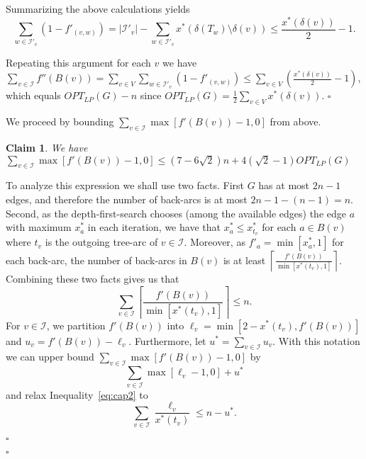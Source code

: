 \documentclass[letterpaper,11pt]{article}
\newtheorem{claim}[theorem]{Claim}
\newenvironment{proofclaim}{\begin{trivlist}
\item[\hskip\labelsep {\it Proof of Claim}.]}{\QED \end{trivlist}}
\newenvironment{proof}{\begin{trivlist}
\item[\hskip\labelsep {\bf Proof}.]}{\QED \end{trivlist}}
\newcommand{\QED}{\hfill $\square$}
\newcommand{\OLP}[1]{\ensuremath{OPT_{LP}(#1)}}
\begin{document}
\begin{proof}
\begin{proofclaim}
\noindent Summarizing the above calculations yields
$$
\sum_{w\in \mathcal{I}'_v} \left(1- f'_{(v,w)}\right) = |\mathcal{I}'_v| -
\sum_{w\in \mathcal{I}'_v} x^*(\delta(T_w) \setminus \delta(v)) \leq \frac{x^*(\delta(v))}{2} - 1.
$$

Repeating this argument for each $v$ we have $\sum_{v\in \mathcal{I}}
f''(B(v)) = \sum_{v \in V} \sum_{w \in \mathcal{I}'_v} \left(1-f'_{(v,w)}\right) \le
\sum_{v\in V} \left(\frac{x^*(\delta(v))}{2} -1\right)$,
which equals $\OLP{G}-n$ since $\OLP{G} = \frac{1}{2}\sum_{v\in V}
x^*(\delta(v))$.
\end{proofclaim}
We proceed by bounding $\sum_{v\in \mathcal{I}} \max[f'(B(v)) -1, 0]$ from above.  
\begin{claim}
\label{claim:secondcost}
We have $\sum_{v\in \mathcal{I}} \max[f'(B(v)) -1, 0] \leq (7-6\sqrt{2})n + 4(\sqrt{2}-1)\OLP{G}$
\end{claim}
\begin{proofclaim}
To analyze this expression we shall use two facts. First
$G$ has at most $2n-1$ edges, and therefore the number of back-arcs
is at most $2n-1 - (n-1) = n$.  Second, as the depth-first-search
chooses (among the available edges) the edge $a$ with maximum $x^*_a$ in
each iteration, we have that $x_{a}^* \leq x_{t_v}^*$ for each $a \in
B(v)$ where $t_v$ is the outgoing tree-arc of $v\in
\mathcal{I}$. Moreover, as $f'_a = \min[x^*_{a}, 1 ]$ for each
back-arc, the number of back-arcs in $B(v)$ is at least $\left\lceil
  \frac{f'(B(v))}{\min[x^*(t_v),1]}\right\rceil$.
Combining these two facts gives us that
 \begin{equation}
\label{eq:cap2}
\sum_{v\in \mathcal{I}}
\left\lceil \frac{f'(B(v))}{\min[x^*(t_v),1]}\right\rceil \leq n. 
\end{equation}
For $v\in \mathcal{I}$, we partition $f'(B(v))$ into $\ell_v =
\min[2-x^*(t_v), f'(B(v))]$ and $u_v = f'(B(v)) -
\ell_v$. Furthermore, let $u^* = \sum_{v\in \mathcal{I}} u_v$. With
this notation we can upper bound $\sum_{v\in \mathcal{I}}
\max[f'(B(v)) -1, 0]$ by
\begin{equation}
\label{eq:fcost}
\sum_{v\in \mathcal{I}} \max[\ell_v - 1, 0] + u^*
\end{equation}
and relax Inequality~\eqref{eq:cap2} to
\begin{equation}
\label{eq:cap}
\sum_{v\in \mathcal{I}} \frac{\ell_v}{x^*(t_v)} \leq  n- u^*.
\end{equation}


\end{proofclaim}
\end{proof}
\end{document}
